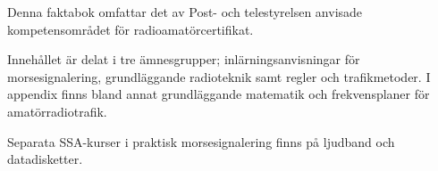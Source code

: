 \onecolumn

Denna faktabok omfattar det av Post- och telestyrelsen anvisade
kompetensområdet för radioamatörcertifikat.

Innehållet är delat i tre ämnesgrupper; inlärningsanvisningar för
morsesignalering, grundläggande radioteknik samt regler och
trafikmetoder. I appendix finns bland annat grundläggande matematik
och frekvensplaner för amatörradiotrafik.

Separata SSA-kurser i praktisk morsesignalering finns på ljudband och
datadisketter.

\twocolumn
